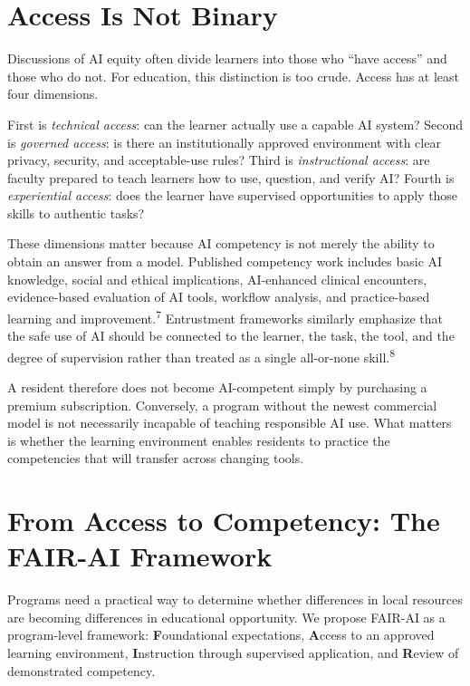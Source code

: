 \documentclass[12pt]{article}
\begin{document}
\section*{Access Is Not Binary}

Discussions of AI equity often divide learners into those who ``have access''
and those who do not. For education, this distinction is too crude. Access has
at least four dimensions.

First is \emph{technical access}: can the learner actually use a capable AI
system? Second is \emph{governed access}: is there an institutionally approved
environment with clear privacy, security, and acceptable-use rules? Third is
\emph{instructional access}: are faculty prepared to teach learners how to use,
question, and verify AI? Fourth is \emph{experiential access}: does the learner
have supervised opportunities to apply those skills to authentic tasks?

These dimensions matter because AI competency is not merely the ability to
obtain an answer from a model. Published competency work includes basic AI
knowledge, social and ethical implications, AI-enhanced clinical encounters,
evidence-based evaluation of AI tools, workflow analysis, and practice-based
learning and improvement.\textsuperscript{7} Entrustment frameworks similarly
emphasize that the safe use of AI should be connected to the learner, the task,
the tool, and the degree of supervision rather than treated as a single
all-or-none skill.\textsuperscript{8}

A resident therefore does not become AI-competent simply by purchasing a
premium subscription. Conversely, a program without the newest commercial
model is not necessarily incapable of teaching responsible AI use. What matters
is whether the learning environment enables residents to practice the
competencies that will transfer across changing tools.

\section*{From Access to Competency: The FAIR-AI Framework}

Programs need a practical way to determine whether differences in local
resources are becoming differences in educational opportunity. We propose
FAIR-AI as a program-level framework: \textbf{F}oundational expectations,
\textbf{A}ccess to an approved learning environment, \textbf{I}nstruction
through supervised application, and \textbf{R}eview of demonstrated
competency.
\end{document}
